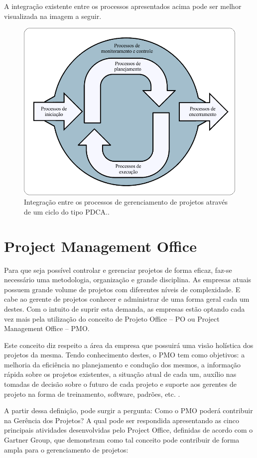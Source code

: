 \documentclass[12pt,a4paper,ruledheader,tocpage=prefix,floatnumber=continuous,pagestart=folhaderosto,font=times]{abnt}
\begin{document}
A integração existente entre os processos apresentados acima pode ser melhor visualizada na imagem a seguir.

\begin{figure}[H]
\centering
\includegraphics[width=.6\textwidth]{img/fig2.png}
\caption{Integração entre os processos de gerenciamento de projetos através de um ciclo do tipo PDCA.\cite{PMBOK2008}.}
\end{figure}

\section{Project Management Office}
Para que seja possível controlar e gerenciar projetos de forma eficaz, faz-se necessário uma metodologia, organização e grande disciplina. As empresas 
atuais possuem grande volume de projetos com diferentes níveis de complexidade. E cabe ao gerente de projetos conhecer e administrar de uma forma geral
cada um destes. Com o intuito de suprir esta demanda, as empresas estão optando cada vez mais pela utilização do conceito de Projeto Office – PO ou Project 
Management Office – PMO.
 
Este conceito diz respeito a área da empresa que possuirá uma visão holística dos projetos da mesma. Tendo conhecimento destes, o PMO tem como objetivos:
a melhoria da eficiência no planejamento e condução dos mesmos, a informação rápida sobre os projetos existentes, a situação atual de cada um, auxílio nas
tomadas de decisão sobre o futuro de cada projeto e suporte aos gerentes de projeto na forma de treinamento, software, padrões, etc. \cite{PMBOK2008}.

A partir dessa definição, pode surgir a pergunta: Como o PMO poderá contribuir na Gerência dos Projetos? A qual pode ser respondida apresentando as cinco
principais atividades desenvolvidas pelo Project Office, definidas de acordo com o Gartner Group, que demonstram como tal conceito pode contribuir de 
forma ampla para o gerenciamento de projetos:
\end{document}
